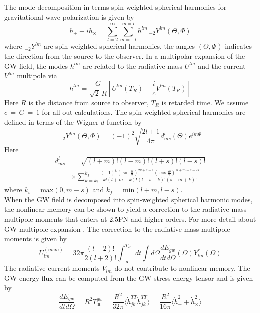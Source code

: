 \documentclass[twocolumn,showpacs,aps,prd,nobibnotes,floatfix]{revtex4-1}
\begin{document}
The mode decomposition in terms spin-weighted spherical harmonics for gravitational wave polarization is given by
\begin{equation}\label{eq:2.1}
	h_+ - \mathit{i}h_{\times} = \sum_{l=2}^{\infty}\sum_{m=-l}^{m=l}h^{lm} \,  _{-2}Y^{lm}(\Theta, \Phi)
\end{equation}
where $_{-2}Y^{lm}$ are spin-weighted spherical harmonics, the angles $(\Theta, \Phi)$ indicates the direction from the source to the observer. In a multipolar expansion of the GW field, the modes $h^{lm}$ are related to the radiative mass $U^{lm}$ and the current $V^{lm}$ multipole via
\begin{equation}\label{eq:2.2}
	h^{lm}= \frac{G}{\sqrt{2}\, R }\left[U^{lm}(T_R)-\frac{\mathit{i}}{c}V^{lm}(T_R)\right]
\end{equation}
Here $R$ is the distance from source to observer, $T_R$ is retarded time. We assume $c\,=\,G\,=\,1$ for all out calculations.
 The spin weighted spherical harmonics are defined in terms of the Wigner $d$ function by
\begin{equation}\label{eq:2.3}
	_{-2}Y^{lm}(\Theta, \Phi) = (-1)^2\sqrt{\frac{2l + 1}{4\pi}}d^{l}_{ms}(\Theta)e^{\mathit{i}m\Phi}
\end{equation} 
Here
\begin{align}\label{eq:2.4}
	d^{l}_{ms}&=\sqrt{(l+m)!(l-m)!(l+s)!(l-s)!}\\
	&\times \sum_{k=k_i}^{k_f}\frac{(-1)^k(\sin\frac{\Theta}{2})^{2k+s-1}(\cos\frac{\Theta}{2})^{1l+m-s-2k}}{k!(l+m-k)!(l-s-k)!(s-m+k)!}
\end{align}
where $k_i$ = max$(0, m-s)$ and $k_f$ = min$(l+m, l-s)$. \\
When the GW field is decomposed into spin-weighted spherical harmonic modes, the nonlinear memory can be shown to yield a correction to the radiative mass multipole moments that enters at 2.5PN and higher orders. For more detail about GW multipole expansion \cite{Thorne1980}. The correction to the radiative mass multipole moments is given by
\begin{equation}\label{eq:2.6}
	U^{(mem)}_{lm}=32\pi\frac{(l-2)!}{2(l+2)!}\int_{-\infty}^{T_R}dt\int d\Omega\frac{dE_{gw}}{dtd\Omega}(\Omega)Y^*_{lm}(\Omega)
\end{equation}
The radiative current moments $V_{lm}$ do not contribute to nonlinear memory. The GW energy flux can be computed from the GW stress-energy tensor and is given by \cite{Favata2010}
\begin{equation}\label{eq:2.7}
	\frac{dE_{gw}}{dtd\Omega} = R^2 T^{gw}_{00} = \frac{R^2}{32\pi}\langle\dot{h}^{TT}_{jk}\dot{h}^{TT}_{jk}\rangle =\frac{R^2}{16\pi}\langle\dot{h}^2_{+}+ \dot{h}^2_{\times}\rangle
\end{equation}
\end{document}
